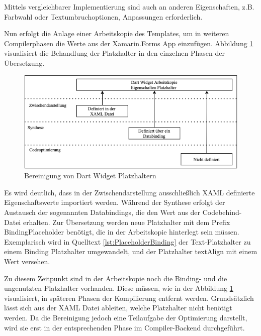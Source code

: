  

Mittels vergleichbarer Implementierung sind auch an anderen Eigenschaften, z.B. Farbwahl oder Textumbruchoptionen,  Anpassungen erforderlich.

Nun erfolgt die Anlage einer Arbeitskopie des Templates,  um in weiteren Compilerphasen die Werte aus der Xamarin.Forms App einzufügen.  Abbildung \ref{fig:PlaceholderOptions} visualisiert die Behandlung der Platzhalter in den einzelnen Phasen der Übersetzung.


\begin{figure}[!ht]
 \includegraphics[width=\textwidth,keepaspectratio]{Images/Implementation/DartPlaceHolder.png}
 \caption{Bereinigung von Dart Widget Platzhaltern}
 \label{fig:PlaceholderOptions}
\end{figure}

Es wird deutlich, dass in der Zwischendarstellung ausschließlich XAML definierte Eigenschaftswerte 
importiert werden.  Während der Synthese erfolgt der Austausch der sogenannten Databindings, die den Wert aus der Codebehind-Datei erhalten.  Zur Übersetzung werden neue Platzhalter mit dem Prefix \glq BindingPlaceholder \grq{} benötigt,  die in der Arbeitskopie hinterlegt sein müssen. Exemplarisch wird in Quelltext  \ref{lst:PlaceholderBinding} der Text-Platzhalter zu einem Binding Platzhalter umgewandelt, und der Platzhalter textAlign mit einem Wert versehen. 

 

Zu diesem Zeitpunkt sind in der Arbeitskopie noch die Binding- und die ungenutzten Platzhalter vorhanden.  Diese müssen, wie in der Abbildung \ref{fig:PlaceholderOptions} visualisiert,  in späteren Phasen der Kompilierung entfernt werden.  Grundsätzlich lässt sich aus der XAML Datei ableiten,  welche Platzhalter nicht benötigt werden.  Da die Bereinigung jedoch eine Teilaufgabe der Optimierung darstellt, wird sie erst in der entsprechenden Phase im Compiler-Backend durchgeführt. 

